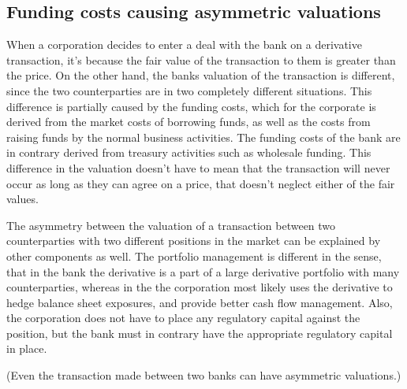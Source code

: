 \documentclass[../../../main.tex]{subfiles}
\begin{document}
    \subsection{Funding costs causing asymmetric valuations}
        When a corporation decides to enter a deal with the bank on a derivative transaction,
        it's because the fair value of the transaction to them is greater than the price.
        On the other hand, the banks valuation of the transaction is different,
        since the two counterparties are in two completely different situations.
        This difference is partially caused by the funding costs,
        which for the corporate is derived from the market costs of borrowing funds,
        as well as the costs from raising funds by the normal business activities.
        The funding costs of the bank are in contrary derived from treasury activities such as wholesale funding.
        This difference in the valuation doesn't have to mean that the transaction will never occur 
        as long as they can agree on a price, that doesn't neglect either of the fair values.

        The asymmetry between the valuation of a transaction between two counterparties with two different positions in the market can be explained by other components as well.
        The portfolio management is different in the sense,
        that in the bank the derivative is a part of a large derivative portfolio with many counterparties,
        whereas in the the corporation most likely uses the derivative to hedge balance sheet exposures,
        and provide better cash flow management.
        Also, the corporation does not have to place any regulatory capital against the position,
        but the bank must in contrary have the appropriate regulatory capital in place.

        (Even the transaction made between two banks can have asymmetric valuations.)
\end{document}
